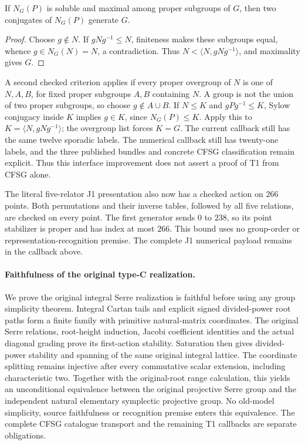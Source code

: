 \begin{lemma}\label{lem:soluble-sylow-normalizer-pairs}
If $N_G(P)$ is soluble and maximal among proper subgroups of $G$,
then two conjugates of $N_G(P)$ generate $G$.
\end{lemma}
\begin{proof}
Choose $g\notin N$. If $gNg^{-1}\leq N$, finiteness makes these
subgroups equal, whence $g\in N_G(N)=N$, a contradiction. Thus
$N<\langle N,gNg^{-1}\rangle$, and maximality gives $G$.
\end{proof}

A second checked criterion applies if every proper overgroup of $N$ is
one of $N,A,B$, for fixed proper subgroups $A,B$ containing $N$.
A group is not the union of two proper subgroups, so choose
$g\notin A\cup B$. If $N\leq K$ and $gPg^{-1}\leq K$, Sylow
conjugacy inside $K$ implies $g\in K$, since $N_G(P)\leq K$.
Apply this to $K=\langle N,gNg^{-1}\rangle$; the overgroup list
forces $K=G$. The current callback still has the same twelve sporadic
labels. The numerical callback still has twenty-one labels, and the
three published bundles and concrete CFSG classification remain explicit.
Thus this interface improvement does not assert a proof of T1 from CFSG alone.

The literal five-relator J1 presentation also now has a checked action
on $266$ points. Both permutations and their inverse tables, followed by
all five relations, are checked on every point. The first generator
sends $0$ to $238$, so its point stabilizer is proper and has index at
most $266$. This bound uses no group-order or representation-recognition
premise. The complete J1 numerical payload remains in the callback above.

\paragraph{Faithfulness of the original type-C realization.}
We prove the original integral Serre realization is faithful before using
any group simplicity theorem. Integral Cartan tails and explicit signed
divided-power root paths form a finite family with primitive natural-matrix
coordinates. The original Serre relations, root-height induction, Jacobi
coefficient identities and the actual diagonal grading prove its
first-action stability. Saturation then gives divided-power stability
and spanning of the same original integral lattice. The coordinate
splitting remains injective after every commutative scalar extension,
including characteristic two. Together with the original-root range
calculation, this yields an unconditional equivalence between the original
projective Serre group and the independent natural elementary symplectic
projective group. No old-model simplicity, source faithfulness or
recognition premise enters this equivalence. The complete CFSG catalogue
transport and the remaining T1 callbacks are separate obligations.


